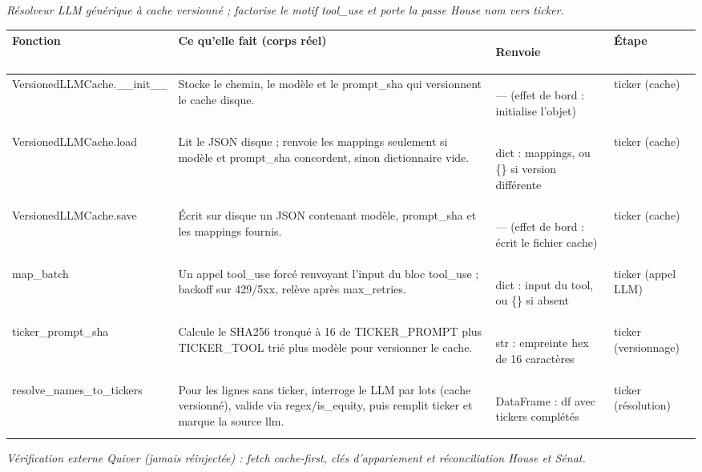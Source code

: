 \documentclass[11pt,a4paper]{article}
\makeatletter
\newenvironment{fnt}{%
  \par\footnotesize
  \setlength{\tabcolsep}{3pt}%
  \begin{longtable}{@{}>{\ttfamily\scriptsize\raggedright\arraybackslash}p{3.0cm} >{\raggedright\arraybackslash}p{7.5cm} >{\itshape\scriptsize\raggedright\arraybackslash}p{2.7cm} >{\scriptsize\raggedright\arraybackslash}p{1.85cm}@{}}
  \toprule
  \normalfont\bfseries\scriptsize Fonction & \bfseries\scriptsize Ce qu'elle fait (corps réel) &
  \normalfont\bfseries\scriptsize Renvoie & \normalfont\bfseries\scriptsize Étape\\
  \midrule\endhead
}{\bottomrule\end{longtable}\par}
\newcommand{\fnmod}[2]{\par\smallskip\noindent{\ttfamily\bfseries #1}\;\textmd{\itshape\small\textemdash{} #2}\par\nobreak\vspace{2pt}}
\makeatother
\begin{document}
\fnmod{llm_resolve.py}{Résolveur LLM générique à cache versionné ; factorise le motif tool_use et porte la passe House nom vers ticker.}
\begin{fnt}
VersionedLLMCache.\allowbreak _\allowbreak _\allowbreak init_\allowbreak _\allowbreak  & Stocke le chemin,\allowbreak{} le modèle et le prompt_sha qui versionnent le cache disque. & — (effet de bord : initialise l'objet)\allowbreak{} & ticker (cache) \\
VersionedLLMCache.\allowbreak load & Lit le JSON disque ; renvoie les mappings seulement si modèle et prompt_sha concordent,\allowbreak{} sinon dictionnaire vide. & dict : mappings,\allowbreak{} ou \{\} si version différente & ticker (cache) \\
VersionedLLMCache.\allowbreak save & Écrit sur disque un JSON contenant modèle,\allowbreak{} prompt_sha et les mappings fournis. & — (effet de bord : écrit le fichier cache)\allowbreak{} & ticker (cache) \\
map_\allowbreak batch & Un appel tool_use forcé renvoyant l'input du bloc tool_use ; backoff sur 429/\allowbreak{}5xx,\allowbreak{} relève après max_retries. & dict : input du tool,\allowbreak{} ou \{\} si absent & ticker (appel LLM) \\
ticker_\allowbreak prompt_\allowbreak sha & Calcule le SHA256 tronqué à 16 de TICKER_PROMPT plus TICKER_TOOL trié plus modèle pour versionner le cache. & str : empreinte hex de 16 caractères & ticker (versionnage) \\
resolve_\allowbreak names_\allowbreak to_\allowbreak tickers & Pour les lignes sans ticker,\allowbreak{} interroge le LLM par lots (cache versionné)\allowbreak{},\allowbreak{} valide via regex/\allowbreak{}is_equity,\allowbreak{} puis remplit ticker et marque la source llm. & DataFrame : df avec tickers complétés & ticker (résolution) \\
\end{fnt}
\fnmod{quiver.py}{Vérification externe Quiver (jamais réinjectée) : fetch cache-first, clés d'appariement et réconciliation House et Sénat.}
\end{document}
